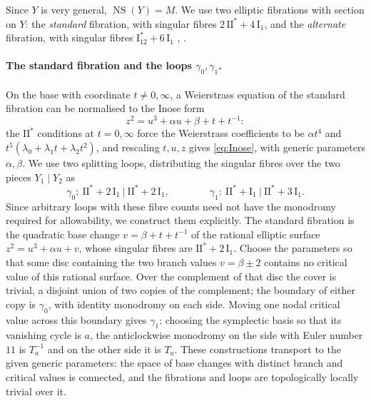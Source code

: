 \documentclass[12pt]{article}
\newcommand{\NS}{\operatorname{NS}}
\newcommand{\II}{\mathrm{II}}
\newcommand{\I}{\mathrm{I}}
\theoremstyle{definition}
\theoremstyle{remark}
\begin{document}
Since \(Y\) is very general, \(\NS(Y)=M\). We use two elliptic
fibrations with section on \(Y\): the \emph{standard} fibration, with
singular fibres \(2\,\II^*+4\,\I_1\), and the \emph{alternate}
fibration, with singular fibres \(\I_{12}^*+6\,\I_1\)
\cite[\S2.2]{DPT}, \cite{CD}.

\paragraph{The standard fibration and the loops \(\gamma_0,\gamma_1\).}
On the base with coordinate \(t\neq0,\infty\), a Weierstrass equation
of the standard fibration can be normalised to the Inose form
\cite{CD}
\begin{equation}\label{eq:Inose}
 z^2=u^3+\alpha u+\beta+t+t^{-1}:
\end{equation}
the \(\II^*\) conditions at \(t=0,\infty\) force the Weierstrass
coefficients to be \(\alpha t^4\) and
\(t^5(\lambda_0+\lambda_1t+\lambda_2t^2)\), and
rescaling \(t,u,z\) gives \eqref{eq:Inose}, with generic parameters
\(\alpha,\beta\). We use two splitting loops, distributing the
singular fibres over the two pieces \(Y_1\mid Y_2\) as
\begin{equation}\label{eq:Eloops}
 \gamma_0\colon\ \II^*+2\,\I_1\ \big|\ \II^*+2\,\I_1,\qquad\qquad
 \gamma_1\colon\ \II^*+\I_1\ \big|\ \II^*+3\,\I_1 .
\end{equation}
Since arbitrary loops with these fibre counts need not have the
monodromy required for allowability, we construct them explicitly.
The standard fibration is the quadratic base change
\(v=\beta+t+t^{-1}\) of the rational elliptic surface
\(z^2=u^3+\alpha u+v\), whose singular fibres are \(\II^*+2\,\I_1\).
Choose the parameters so that some disc containing the two branch
values \(v=\beta\pm2\) contains no critical value of this rational
surface. Over the complement of that disc the cover is trivial, a
disjoint union of two copies of the complement; the boundary of either copy is \(\gamma_0\), with
identity monodromy on each side. Moving one nodal critical value
across this boundary gives \(\gamma_1\): choosing the symplectic basis
so that its vanishing cycle is \(a\), the anticlockwise monodromy on
the side with Euler number \(11\) is \(T_a^{-1}\) and on the other side
it is \(T_a\). These
constructions transport to the given generic parameters: the space of
base changes with distinct branch and critical values is connected,
and the fibrations and loops are topologically locally trivial over it.
\end{document}
